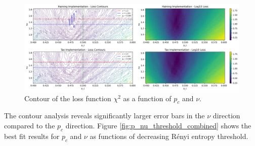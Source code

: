 \documentclass[11pt,a4paper]{article}
\begin{document}
\begin{figure}[H]
    \centering
    \includegraphics[width=0.8\linewidth]{loss_manifold_comparison_pctrl0.000_threshold1.0e-15.png}
    \caption{Contour of the loss function $\chi^2$ as a function of $p_c$ and $\nu$.}
    \label{fig:chi2_contour}
\end{figure}

The contour analysis reveals significantly larger error bars in the $\nu$ direction compared to the $p_c$ direction. Figure \ref{fig:p_nu_threshold_combined} shows the best fit results for $p_c$ and $\nu$ as functions of decreasing Rényi entropy threshold.
\end{document}
